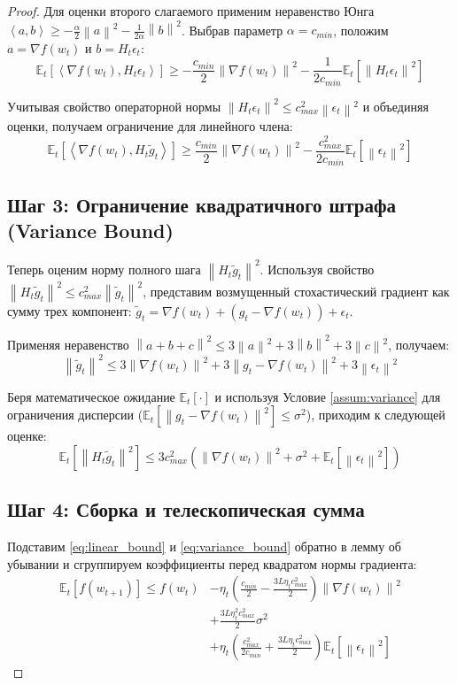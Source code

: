 \documentclass[11pt]{article}
\newcommand{\E}{\mathbb{E}}
\newcommand{\norm}[1]{\left\|#1\right\|}
\newcommand{\inner}[2]{\left\langle #1, #2 \right\rangle}
\begin{document}
\begin{proof}
Для оценки второго слагаемого применим неравенство Юнга $\inner{a}{b} \ge -\frac{\alpha}{2}\norm{a}^2 - \frac{1}{2\alpha}\norm{b}^2$. Выбрав параметр $\alpha = c_{min}$, положим $a = \nabla f(w_t)$ и $b = H_t \epsilon_t$:
\begin{equation}
    \E_t[\inner{\nabla f(w_t)}{H_t \epsilon_t}] \ge -\frac{c_{min}}{2} \norm{\nabla f(w_t)}^2 - \frac{1}{2 c_{min}} \E_t\left[\norm{H_t \epsilon_t}^2\right]
\end{equation}

Учитывая свойство операторной нормы $\norm{H_t \epsilon_t}^2 \le c_{max}^2 \norm{\epsilon_t}^2$ и объединяя оценки, получаем ограничение для линейного члена:
\begin{equation}
\label{eq:linear_bound}
    \E_t[\inner{\nabla f(w_t)}{H_t \tilde{g}_t}] \ge \frac{c_{min}}{2} \norm{\nabla f(w_t)}^2 - \frac{c_{max}^2}{2 c_{min}} \E_t[\norm{\epsilon_t}^2]
\end{equation}

\subsection*{Шаг 3: Ограничение квадратичного штрафа (Variance Bound)}
Теперь оценим норму полного шага $\norm{H_t \tilde{g}_t}^2$.
Используя свойство $\norm{H_t \tilde{g}_t}^2 \le c_{max}^2 \norm{\tilde{g}_t}^2$, представим возмущенный стохастический градиент как сумму трех компонент: $\tilde{g}_t = \nabla f(w_t) + (g_t - \nabla f(w_t)) + \epsilon_t$.

Применяя неравенство $\norm{a+b+c}^2 \le 3\norm{a}^2 + 3\norm{b}^2 + 3\norm{c}^2$, получаем:
\begin{equation}
    \norm{\tilde{g}_t}^2 \le 3\norm{\nabla f(w_t)}^2 + 3\norm{g_t - \nabla f(w_t)}^2 + 3\norm{\epsilon_t}^2
\end{equation}

Беря математическое ожидание $\E_t[\cdot]$ и используя Условие \ref{assum:variance} для ограничения дисперсии ($\E_t[\norm{g_t - \nabla f(w_t)}^2] \le \sigma^2$), приходим к следующей оценке:
\begin{equation}
\label{eq:variance_bound}
    \E_t[\norm{H_t \tilde{g}_t}^2] \le 3 c_{max}^2 \left( \norm{\nabla f(w_t)}^2 + \sigma^2 + \E_t[\norm{\epsilon_t}^2] \right)
\end{equation}

\subsection*{Шаг 4: Сборка и телескопическая сумма}
Подставим \eqref{eq:linear_bound} и \eqref{eq:variance_bound} обратно в лемму об убывании и сгруппируем коэффициенты перед квадратом нормы градиента:
\begin{align}
    \E_t [f(w_{t+1})] \le f(w_t) &- \eta_t \left( \frac{c_{min}}{2} - \frac{3 L \eta_t c_{max}^2}{2} \right) \norm{\nabla f(w_t)}^2 \nonumber \\
    &+ \frac{3 L \eta_t^2 c_{max}^2}{2} \sigma^2 \nonumber \\
    &+ \eta_t \left( \frac{c_{max}^2}{2 c_{min}} + \frac{3 L \eta_t c_{max}^2}{2} \right) \E_t[\norm{\epsilon_t}^2]
\end{align}


\end{proof}
\end{document}
